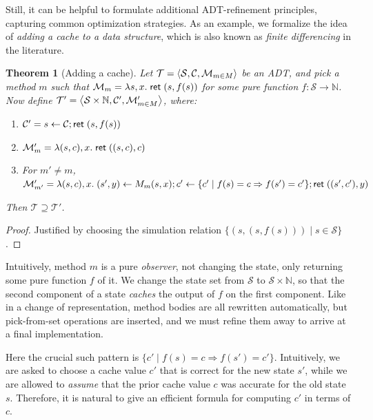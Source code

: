 \documentclass{amsbook}
\newtheorem{theorem}{Theorem}[chapter]
\theoremstyle{definition}
\theoremstyle{remark}
\numberwithin{section}{chapter}
\numberwithin{equation}{chapter}
\begin{document}
Still, it can be helpful to formulate additional ADT-refinement principles, capturing common optimization strategies.
As an example, we formalize the idea of \emph{adding a cache to a data structure}, which is also known as \emph{finite differencing} in the literature.

\begin{theorem}[Adding a cache]
  Let $\mathcal T = {\left \langle \mathcal S, \mathcal C, \mathcal M_{m \in M} \right \rangle}$ be an ADT, and pick a method $m$ such that $\mathcal M_m = \lambda s, x. \; \mathsf{ret} \; (s, f(s))$ for some pure function $f : \mathcal S \to \mathbb N$.
  Now define $\mathcal T' = {\left \langle \mathcal S \times \mathbb N, \mathcal C', \mathcal M'_{m \in M} \right \rangle}$, where:
  \begin{enumerate}
  \item $\mathcal C' = s \leftarrow \mathcal C; \mathsf{ret} \; (s, f(s))$
  \item $\mathcal M'_m = \lambda (s, c), x. \; \mathsf{ret} \; ((s, c), c)$
  \item For $m' \neq m$, $\mathcal M'_{m'} = \lambda (s, c), x. \; \mathcal (s', y) \leftarrow M_m(s, x); c' \leftarrow \{c' \mid f(s) = c \Rightarrow f(s') = c'\}; \mathsf{ret} \; ((s', c'), y)$
  \end{enumerate}
  Then $\mathcal T \supseteq \mathcal T'$.
\end{theorem}
\begin{proof}
  Justified by choosing the simulation relation $\{(s, (s, f(s))) \mid s \in \mathcal S\}$.
\end{proof}

Intuitively, method $m$ is a pure \emph{observer}, not changing the state, only returning some pure function $f$ of it.
We change the state set from $\mathcal S$ to $\mathcal S \times \mathbb N$, so that the second component of a state \emph{caches} the output of $f$ on the first component.
Like in a change of representation, method bodies are all rewritten automatically, but pick-from-set operations are inserted, and we must refine them away to arrive at a final implementation.

Here the crucial such pattern is $\{c' \mid f(s) = c \Rightarrow f(s') = c'\}$.
Intuitively, we are asked to choose a cache value $c'$ that is correct for the new state $s'$, while we are allowed to \emph{assume} that the prior cache value $c$ was accurate for the old state $s$.
Therefore, it is natural to give an efficient formula for computing $c'$ in terms of $c$.
\end{document}
